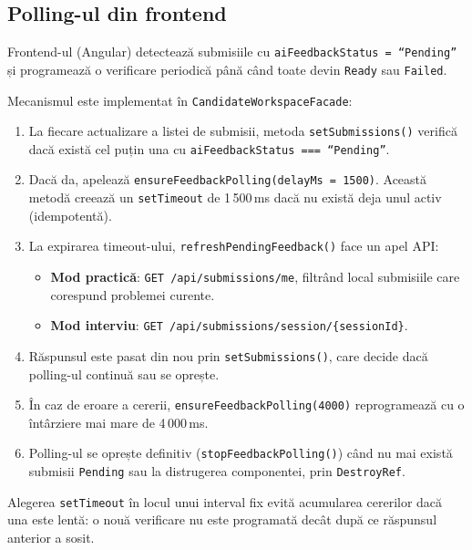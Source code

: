 \subsection{Polling-ul din frontend}

Frontend-ul (Angular) detectează submisiile cu \texttt{aiFeedbackStatus = ``Pending''}
și programează o verificare periodică până când toate devin \texttt{Ready}
sau \texttt{Failed}.

Mecanismul este implementat în \texttt{CandidateWorkspaceFacade}:

\begin{enumerate}
  \item La fiecare actualizare a listei de submisii, metoda
        \texttt{setSubmissions()} verifică dacă există cel puțin una cu
        \texttt{aiFeedbackStatus === ``Pending''}.
  \item Dacă da, apelează \texttt{ensureFeedbackPolling(delayMs = 1500)}.
        Această metodă creează un \texttt{setTimeout} de 1\,500\,ms dacă
        nu există deja unul activ (idempotentă).
  \item La expirarea timeout-ului, \texttt{refreshPendingFeedback()} face
        un apel API:
        \begin{itemize}
          \item \textbf{Mod practică}: \texttt{GET /api/submissions/me},
                filtrând local submisiile care corespund problemei curente.
          \item \textbf{Mod interviu}: \texttt{GET /api/submissions/session/\{sessionId\}}.
        \end{itemize}
  \item Răspunsul este pasat din nou prin \texttt{setSubmissions()}, care
        decide dacă polling-ul continuă sau se oprește.
  \item În caz de eroare a cererii, \texttt{ensureFeedbackPolling(4000)}
        reprogramează cu o întârziere mai mare de 4\,000\,ms.
  \item Polling-ul se oprește definitiv (\texttt{stopFeedbackPolling()})
        când nu mai există submisii \texttt{Pending} sau la distrugerea
        componentei, prin \texttt{DestroyRef}.
\end{enumerate}

Alegerea \texttt{setTimeout} în locul unui interval fix evită
acumularea cererilor dacă una este lentă: o nouă verificare nu
este programată decât după ce răspunsul anterior a sosit.
